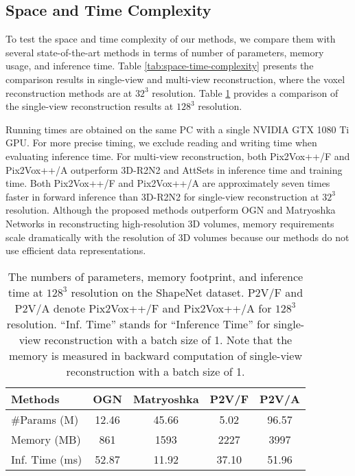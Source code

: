 \documentclass[twocolumn]{svjour3}
\begin{document}
\subsection{Space and Time Complexity}

To test the space and time complexity of our methods, we compare them with several state-of-the-art methods in terms of number of parameters, memory usage, and inference time.
Table \ref{tab:space-time-complexity} presents the comparison results in single-view and multi-view reconstruction, where the voxel reconstruction methods are at $32^3$ resolution.
Table \ref{tab:space-time-complexity-high-resolution} provides a comparison of the single-view reconstruction results at $128^3$ resolution.

Running times are obtained on the same PC with a single NVIDIA GTX 1080 Ti GPU.
For more precise timing, we exclude reading and writing time when evaluating inference time.
For multi-view reconstruction, both Pix2Vox++/F and Pix2Vox++/A outperform 3D-R2N2 and AttSets in inference time and training time.
Both Pix2Vox++/F and Pix2Vox++/A are approximately seven times faster in forward inference than 3D-R2N2 for single-view reconstruction at $32^3$ resolution.
Although the proposed methods outperform OGN \citep{DBLP:conf/iccv/TatarchenkoDB17} and Matryoshka Networks \citep{DBLP:conf/cvpr/Richter018} in reconstructing high-resolution 3D volumes, memory requirements scale dramatically with the resolution of 3D volumes because our methods do not use efficient data representations.

\begin{table}
  \caption{The numbers of parameters, memory footprint, and inference time at $128^3$ resolution on the ShapeNet dataset. P2V/F and P2V/A denote Pix2Vox++/F and Pix2Vox++/A for $128^3$ resolution. ``Inf. Time'' stands for ``Inference Time'' for single-view reconstruction with a batch size of 1. Note that the memory is measured in backward computation of single-view reconstruction with a batch size of 1.}
  \centering
  \begin{tabularx}{\linewidth}{lcccc}
  \toprule
  Methods         & OGN         & Matryoshka
                  & P2V/F       & P2V/A \\
  \midrule
  \#Params (M)    & 12.46       & 45.66
                  & 5.02        & 96.57 \\
  Memory (MB)     & 861         & 1593
                  & 2227        & 3997 \\
  Inf. Time (ms)  & 52.87       & 11.92
                  & 37.10       & 51.96 \\
  \bottomrule
  \end{tabularx}
  \label{tab:space-time-complexity-high-resolution}
\end{table}
\end{document}
